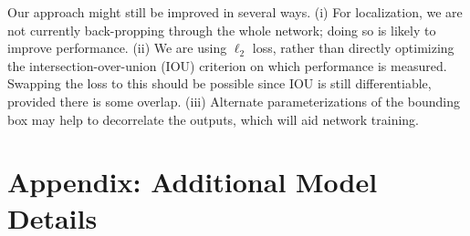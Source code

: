 \documentclass{article} %
\begin{document}

Our approach might still be improved in several ways.  (i) For localization,
we are not currently back-propping through the whole network; doing so
is likely to improve performance. (ii) We are using $\ell_2$ loss,
rather than directly optimizing the intersection-over-union (IOU) criterion
on which performance is measured. Swapping the loss to this should be
possible since IOU is still differentiable, provided there is some
overlap. (iii) Alternate parameterizations of the bounding box may
help to decorrelate the outputs, which will aid network training. 

{\small
  
  

%

%   
%   
%   
%   
%   
%   
%   
%   
%   
%   
}

\newpage
\section*{Appendix:  Additional Model Details}
\end{document}

